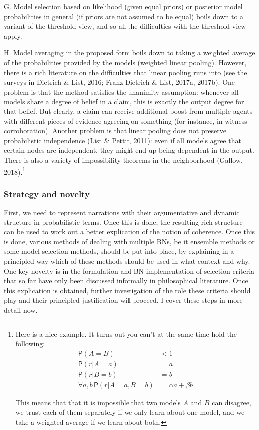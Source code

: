 \documentclass[11pt,dvipsnames,enabledeprecatedfontcommands]{scrartcl}
\newcommand{\pr}[1]{\mathsf{P}(#1)}
\begin{document}
G. Model selection based on likelihood (given equal priors) or posterior
model probabilities in general (if priors are not assumed to be equal)
boils down to a variant of the threshold view, and so all the
difficulties with the threshold view apply.

H. Model averaging in the proposed form boils down to taking a weighted
average of the probabilities provided by the models (weighted linear
pooling). However, there is a rich literature on the difficulties that
linear pooling runs into (see the surveys in Dietrich \& List, 2016;
Franz Dietrich \& List, 2017a, 2017b). One problem is that the method
satisfies the unanimity assumption: whenever all models share a degree
of belief in a claim, this is exactly the output degree for that belief.
But clearly, a claim can receive additional boost from multiple agents
with different pieces of evidence agreeing on something (for instance,
in witness corroboration). Another problem is that linear pooling does
not preserve probabilistic independence (List \& Pettit, 2011): even if
all models agree that certain nodes are independent, they might end up
being dependent in the output. There is also a variety of impossibility
theorems in the neighborhood (Gallow,
2018).\footnote{Here is a nice example. It turns out you can't at the same time hold the following: 
\begin{align}
\pr{A=B} & <1\\
\pr{r\vert A=a} & = a \\
\pr{r\vert B=b} & = b \\
\forall a,b \, \pr{r \vert A =a, B = b} & =  \alpha a + \beta b
\end{align}

\noindent This means that that it is impossible that two models $A$ and $B$ can disagree, we trust each of them separately if we only learn about one model, and we take a weighted average if we learn about both.}

\hypertarget{strategy-and-novelty}{%
\subsubsection{Strategy and novelty}\label{strategy-and-novelty}}

First, we need to represent narrations with their argumentative and
dynamic structure in probabilistic terms. Once this is done, the
resulting rich structure can be used to work out a better explication of
the notion of coherence. Once this is done, various methods of dealing
with multiple BNs, be it ensemble methods or some model selection
methods, should be put into place, by explaining in a principled way
which of these methods should be used in what context and why. One key
novelty is in the formulation and BN implementation of selection
criteria that so far have only been discussed informally in
philosophical literature. Once this explication is obtained, further
investigation of the role these criteria should play and their
principled justification will proceed. I cover these steps in more
detail now.
\end{document}
